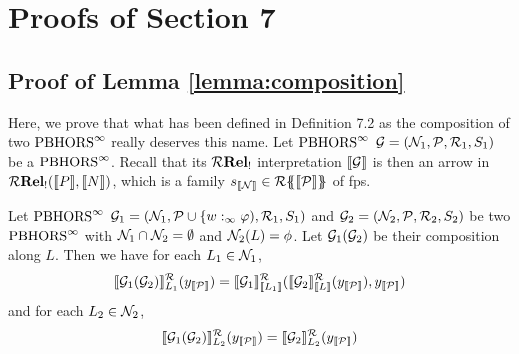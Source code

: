 \section{Proofs of Section 7}
\subsection{Proof of Lemma \ref{lemma:composition}}
Here, we prove that what has been defined in Definition 7.2 as the composition of two $\text{PBHORS}^{\infty}$ really deserves this name.
Let  $\text{PBHORS}^{\infty}$ $\mathcal{G}=(\mathcal{N}_1,\mathcal{P} ,\mathcal{R}_1,S_1)$ be a $\text{PBHORS}^{\infty}$. Recall that its $\mathcal{R}\mathbf{Rel_!}$ interpretation $\llbracket\mathcal{G}\rrbracket$ is then an arrow in $\mathcal{R}\mathbf{Rel_!}(\llbracket P\rrbracket, \llbracket N\rrbracket)$, which is a family $s_{\llbracket\mathcal{N}\rrbracket} \in {\mathcal{R}}\{\!\!\{\llbracket\mathcal{P}\rrbracket\}\!\!\}$ of fps.
\begin{lemma}
	Let  $\text{PBHORS}^{\infty}$ $\mathcal{G}_1=(\mathcal{N}_1,\mathcal{P}\cup\{w:_\infty\varphi),\mathcal{R}_1,S_1)$ and
	$\mathcal{G}_2=(\mathcal{N}_2,\mathcal{P},\mathcal{R}_2,S_2)$ be two $\text{PBHORS}^{\infty}$ with $\mathcal{N}_1 \cap \mathcal{N}_2= \emptyset$ and $\mathcal{N}_2(L) = \phi$. Let $\mathcal{G}_1(\mathcal{G}_2)$ be their composition along $L$. Then we have for each $L_1 \in \mathcal{N}_1 $,
	$$\llbracket\mathcal{G}_1(\mathcal{G}_2)\rrbracket_{L_1}^{\mathcal{R}}(y_{\llbracket\mathcal{P}\rrbracket}) = \llbracket\mathcal{G}_1\rrbracket^{\mathcal{R}}_{\llbracket L_1\rrbracket}(\llbracket\mathcal{G}_2\rrbracket^{\mathcal{R}}_{\llbracket L\rrbracket}(y_{\llbracket\mathcal{P}\rrbracket}),y_{\llbracket\mathcal{P}\rrbracket} )$$
	and for each $L_2 \in \mathcal{N}_2$,
	$$ \llbracket\mathcal{G}_1(\mathcal{G}_2)\rrbracket_{L_2}^{\mathcal{R}}(y_{\llbracket\mathcal{P}\rrbracket}) = \llbracket\mathcal{G}_2\rrbracket_{L_2}^{\mathcal{R}}(y_{\llbracket\mathcal{P}\rrbracket}) $$
\end{lemma}
